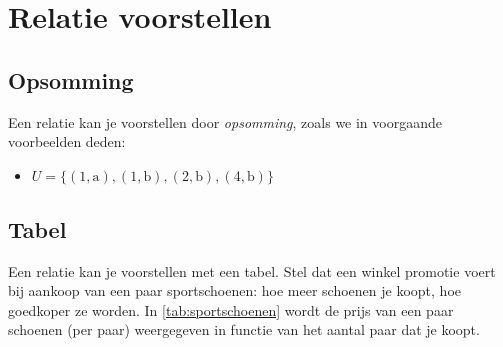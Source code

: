 %
%
%
%
%


\section{Relatie voorstellen}
\label{sec:relatieVoorstellen}
\subsection{Opsomming}
Een  relatie kan je voorstellen door \emph{opsomming}, zoals we in voorgaande voorbeelden deden:
\begin{itemize}
\item $U=\{(1,\mathrm{a}),(1,\mathrm{b}),(2,\mathrm{b}),(4,\mathrm{b}) \}$
\end{itemize}

\subsection{Tabel}
Een relatie kan je voorstellen met een tabel. Stel dat een winkel promotie voert bij aankoop van een paar sportschoenen: hoe meer schoenen je koopt, hoe goedkoper  ze worden.
In \cref{tab:sportschoenen} wordt de prijs van een paar schoenen (per paar) weergegeven in functie van het aantal paar dat je koopt.

